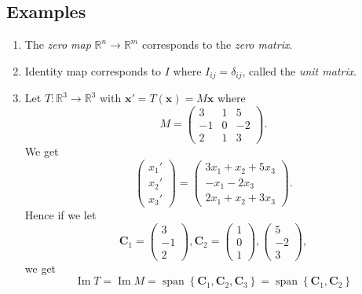\documentclass[10pt]{article}
\DeclareMathOperator{\spn}{span}
\DeclareMathOperator{\im}{Im}
\begin{document}
    \subsection{Examples}
    \begin{example}
        \begin{enumerate}[(1)]
            \item The \textit{zero map} $ \mathbb{R}^{n}\to \mathbb{R}^{m} $ corresponds to the \textit{zero matrix}.
            \item Identity map corresponds to $ I $ where $ I_{ij}=\delta_{ij} $, called the \textit{unit matrix}.
            \item Let $ T:\mathbb{R}^{3}\to \mathbb{R}^{3} $ with $ \mathbf{x}'=T(\mathbf{x})=M \mathbf{x} $ where 
            \[
                M=\begin{pmatrix}
                    3&1&5\\-1&0&-2\\2&1&3
                \end{pmatrix}
            .\]
            We get 
            \[
                \begin{pmatrix}
                    x_1'\\x_2'\\x_3'
                \end{pmatrix}=\begin{pmatrix}
                    3x_1+x_2+5x_3\\-x_1-2x_3\\2x_1+x_2+3x_3
                \end{pmatrix}
            .\]
            Hence if we let 
            \[
                \mathbf{C}_1=\begin{pmatrix}
                    3\\-1\\2
                \end{pmatrix},
                \mathbf{C}_2=\begin{pmatrix}
                    1\\0\\1
                \end{pmatrix},
                \begin{pmatrix}
                    5\\-2\\3
                \end{pmatrix}
            ,\]
            we get 
            \[
                \im T=\im M = \spn\left\{ \mathbf{C}_1,\mathbf{C}_2,\mathbf{C}_3\right\}=\spn\left\{ \mathbf{C}_1, \mathbf{C}_2\right\}
\]
\end{enumerate}
\end{example}
\end{document}
